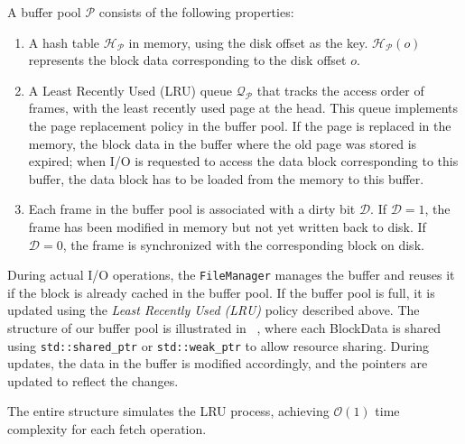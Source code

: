 A buffer pool $\mathcal{P}$ consists of the following properties:

\begin{enumerate}
    \item A hash table $\mathcal{H}_\mathcal{P}$ in memory, using the disk offset as the key. $\mathcal{H}_\mathcal{P}(o)$ represents the block data corresponding to the disk offset $o$.
    
    \item A Least Recently Used (LRU) queue $\mathcal{Q}_\mathcal{P}$ that tracks the access order of frames, with the least recently used page at the head. This queue implements the page replacement policy in the buffer pool. If the page is replaced in the memory, the block data in the buffer where the old page was stored is expired; when I/O is requested to access the data block corresponding to this buffer, the data block has to be loaded from the memory to this buffer. 
    
    \item Each frame in the buffer pool is associated with a dirty bit $\mathcal{D}$. If $\mathcal{D} = 1$, the frame has been modified in memory but not yet written back to disk. If $\mathcal{D} = 0$, the frame is synchronized with the corresponding block on disk. 
\end{enumerate}

During actual I/O operations, the \texttt{FileManager} manages the buffer and reuses it if the block is already cached in the buffer pool. If the buffer pool is full, it is updated using the \textit{Least Recently Used (LRU)} policy described above. The structure of our buffer pool is illustrated in ~, where each BlockData is shared using \texttt{std::shared\_ptr} or \texttt{std::weak\_ptr} to allow resource sharing. During updates, the data in the buffer is modified accordingly, and the pointers are updated to reflect the changes.

The entire structure simulates the LRU process, achieving $\mathcal{O}(1)$ time complexity for each fetch operation.
